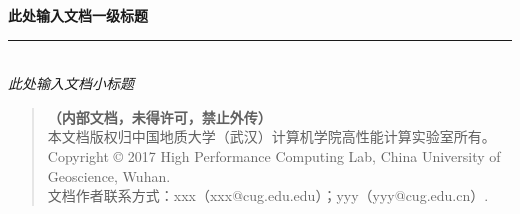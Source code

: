 \thispagestyle{empty}

\noindent\begin{minipage}{\textwidth}
\raggedleft
{\huge \bfseries 此处输入文档一级标题}
\noindent\rule[-1ex]{\textwidth}{5pt}\\[2.5ex]
\hfill\emph{\Large 此处输入文档小标题}
\end{minipage}

\noindent{}


\begin{quote}\footnotesize
   \textbf{（内部文档，未得许可，禁止外传）}\\
    本文档版权归中国地质大学（武汉）计算机学院高性能计算实验室所有。\\
    Copyright \copyright{}  2017  High Performance Computing Lab, China University of Geoscience, Wuhan. \\
    文档作者联系方式：xxx（xxx@cug.edu.edu）；yyy（yyy@cug.edu.cn）.
\end{quote}